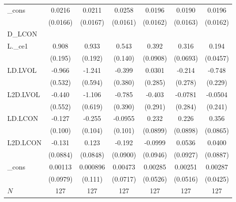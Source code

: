 \begin{table}
\begin{center}
{\begin{tabular}{l*{6}{c}}
\_cons    &   0.0216         &   0.0211         &   0.0258         &   0.0196         &   0.0190         &   0.0196         \\
          & (0.0166)         & (0.0167)         & (0.0161)         & (0.0162)         & (0.0163)         & (0.0162)         \\
\hline
D\_LCON    &                  &                  &                  &                  &                  &                  \\
L.\_ce1    &    0.908\sym{***}&    0.933\sym{***}&    0.543\sym{***}&    0.392\sym{***}&    0.316\sym{***}&    0.194\sym{***}\\
          &  (0.195)         &  (0.192)         &  (0.140)         & (0.0908)         & (0.0693)         & (0.0457)         \\
LD.LVOL   &   -0.966\sym{+}  &   -1.241\sym{*}  &   -0.399         &   0.0301         &   -0.214         &   -0.748\sym{**} \\
          &  (0.532)         &  (0.594)         &  (0.380)         &  (0.285)         &  (0.278)         &  (0.229)         \\
L2D.LVOL  &   -0.440         &   -1.106\sym{+}  &   -0.785\sym{*}  &   -0.403         &  -0.0781         &  -0.0504         \\
          &  (0.552)         &  (0.619)         &  (0.390)         &  (0.291)         &  (0.284)         &  (0.241)         \\
LD.LCON   &   -0.127         &   -0.255\sym{*}  &  -0.0955         &    0.232\sym{**} &    0.226\sym{*}  &    0.356\sym{***}\\
          &  (0.100)         &  (0.104)         &  (0.101)         & (0.0899)         & (0.0898)         & (0.0865)         \\
L2D.LCON  &   -0.131         &    0.123         &   -0.192\sym{*}  &  -0.0999         &   0.0536         &   0.0400         \\
          & (0.0884)         & (0.0848)         & (0.0900)         & (0.0946)         & (0.0927)         & (0.0887)         \\
\_cons    &  0.00113         & 0.000896         &  0.00473         &  0.00285         &  0.00251         &  0.00287         \\
          & (0.0979)         &  (0.111)         & (0.0717)         & (0.0526)         & (0.0516)         & (0.0425)         \\
\hline
\(N\)     &      127         &      127         &      127         &      127         &      127         &      127         \\

\end{tabular}}
\end{center}
\end{table}
